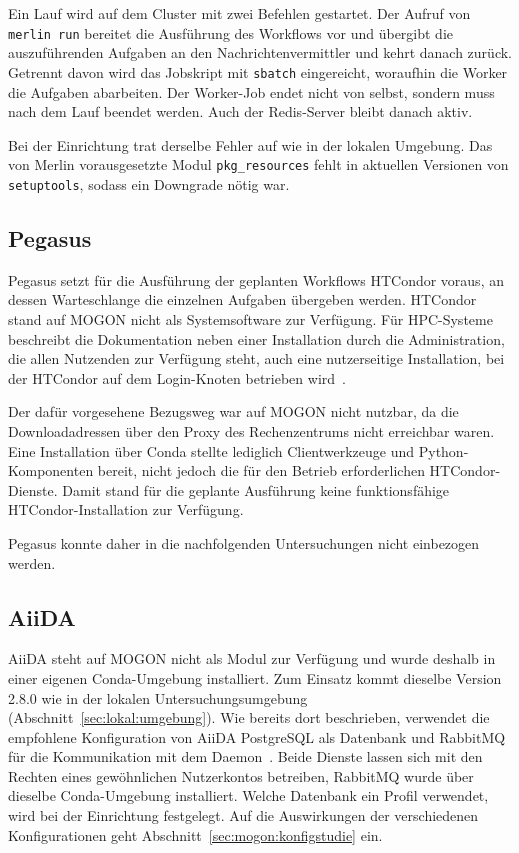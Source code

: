 Ein Lauf wird auf dem Cluster mit zwei Befehlen gestartet. Der Aufruf von \texttt{merlin run} bereitet die Ausführung des
Workflows vor und übergibt die auszuführenden Aufgaben an den
Nachrichtenvermittler und kehrt danach zurück. Getrennt
davon wird das Jobskript mit \texttt{sbatch} eingereicht, woraufhin
die Worker die Aufgaben abarbeiten. Der Worker-Job endet nicht von
selbst, sondern muss nach dem Lauf beendet werden. Auch der
Redis-Server bleibt danach aktiv. 

Bei der Einrichtung trat derselbe Fehler auf wie in der lokalen Umgebung. Das von Merlin vorausgesetzte Modul \texttt{pkg\_resources} fehlt in aktuellen
Versionen von \texttt{setuptools}, sodass ein Downgrade nötig war.


\subsection{Pegasus}
\label{sec:mogon:pegasus}

Pegasus setzt für die Ausführung der geplanten Workflows HTCondor
voraus, an dessen Warteschlange die einzelnen Aufgaben übergeben
werden. HTCondor stand auf MOGON nicht als Systemsoftware zur Verfügung.
Für HPC-Systeme beschreibt die Dokumentation neben einer
Installation durch die Administration, die allen Nutzenden zur
Verfügung steht, auch eine nutzerseitige Installation, bei der
HTCondor auf dem Login-Knoten betrieben wird~\cite{pegasusdocs}.

Der dafür vorgesehene Bezugsweg war auf MOGON nicht nutzbar, da die
Downloadadressen über den Proxy des Rechenzentrums nicht erreichbar
waren. Eine Installation über Conda stellte lediglich
Clientwerkzeuge und Python-Komponenten bereit, nicht jedoch die für
den Betrieb erforderlichen HTCondor-Dienste. Damit stand für die
geplante Ausführung keine funktionsfähige HTCondor-Installation zur
Verfügung.

Pegasus konnte daher in die nachfolgenden Untersuchungen nicht einbezogen werden.

\subsection{AiiDA}
\label{sec:mogon:aiida}
AiiDA steht auf MOGON nicht als Modul zur Verfügung und wurde
deshalb in einer eigenen Conda-Umgebung installiert. Zum Einsatz
kommt dieselbe Version 2.8.0 wie in der lokalen
Untersuchungsumgebung (Abschnitt~\ref{sec:lokal:umgebung}). Wie bereits dort beschrieben, verwendet die empfohlene Konfiguration von AiiDA PostgreSQL als Datenbank und RabbitMQ für die Kommunikation mit dem Daemon~\cite{aiidadocs-install}. Beide Dienste lassen sich mit den Rechten eines gewöhnlichen
Nutzerkontos betreiben, RabbitMQ wurde über dieselbe Conda-Umgebung
installiert. Welche Datenbank ein Profil verwendet, wird bei der Einrichtung
festgelegt. Auf die Auswirkungen der verschiedenen
Konfigurationen geht Abschnitt~\ref{sec:mogon:konfigstudie} ein.

